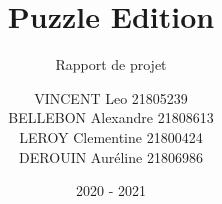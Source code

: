 \documentclass[report]{BetterDocument}
\title{Puzzle Edition}
\subtitle{Rapport de projet}
\author{VINCENT Leo 21805239\\
BELLEBON Alexandre 21808613\\
LEROY Clementine 21800424\\
DEROUIN Auréline 21806986}
\date{2020 - 2021}
\institute{Unicaen}
\begin{document}
	\pageDeGarde

	\tableDesMatieres

	

	

	

	

	
\end{document}
